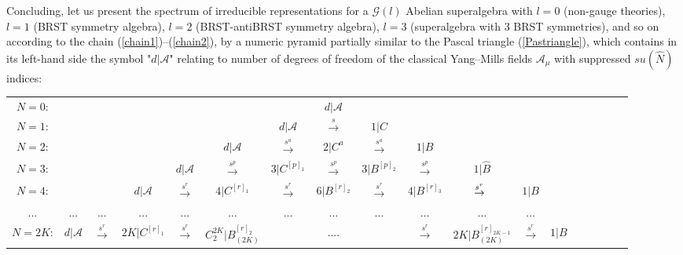 \documentclass[10pt]{article}
\begin{document}
Concluding, let us present  the  spectrum of irreducible representations for a $\mathcal{G}(l)$ Abelian superalgebra
with $l=0$ (non-gauge theories), $l=1$ (BRST symmetry algebra),
$l=2$ (BRST-antiBRST symmetry algebra), $l=3$ (superalgebra with $3$ BRST symmetries),
and so on according to the chain (\ref{chain1})--(\ref{chain2}),  by a numeric pyramid partially similar to the Pascal triangle
(\ref{Pastriangle}), which contains in its left-hand side the symbol "$d|\mathcal{A}$" relating to number of degrees of freedom  of the classical
Yang--Mills fields $\mathcal{A}_\mu$ with suppressed $su(\hat{N})$ indices:
\begin{table}
\begin{center}
{\footnotesize\begin{tabular}{ccccccccc ccccccccc}
     $N=0$:    &&&& && & $d|\mathcal{A}$ & & &&&&&\\
$N=1$: &&& & &&$d|\mathcal{A}$&\hspace{-0.5em}$\stackrel{s}{\to}$ & $1|C$&& &&&&&\\
$N=2$: & & && &\hspace{-0.5em}$d|\mathcal{A}$&$\stackrel{s{}^a}{\to}$& \hspace{-0.5em}$2|C^{a}$ &$\stackrel{s{}^a}{\to}$&$1|B$&&&\\
$N=3$: & && &$d|\mathcal{A}$&\hspace{-0.5em}$\stackrel{s{}^p}{\to}$ &\hspace{-0.5em}$3|C^{[p]_1}$& $\stackrel{s{}^p}{\to}$ &$3|B^{[p]_2}$&$\stackrel{s{}^p}{\to}$&\hspace{-0.5em}$1|\widehat{B}$&& \\
$N=4$:    &&&$d|\mathcal{A}$& $\stackrel{s{}^r}{\to}$ &$4|C^{[r]_1}$&\hspace{-0.5em}$\stackrel{s{}^r}{\to}$&$6|B^{[r]_2}$&$\stackrel{s{}^r}{\to}$&\hspace{-0.5em}$4|B^{[r]_3}$&$\hspace{-0.5em}\stackrel{s{}^r}{\to}$&\hspace{-0.8em}$1|B$ &\\
...&... & ...&... & ... &...
&...&...&...&...&...&...&&\\
$N=2K$:&\hspace{-0.5em}$d|\mathcal{A}$& \hspace{-0.5em}$\stackrel{s{}^r}{\to}$ &\hspace{-0.5em} $2K|C^{[r]_1}$&\hspace{-0.5em}$\stackrel{s{}^r}{\to}$& \hspace{-0.5em} $C^{2K}_2|B_{(2K)}^{[r]_2}$ &&....&&\hspace{-0.7em}$\stackrel{s{}^r}{\to}$ &\hspace{-0.7em}${2K}|B^{[r]_{2K-1}}_{(2K)} $&\hspace{-0.5em}$\stackrel{s{}^r}{\to}$&\hspace{-0.5em}$1|B$

\end{tabular}}
\end{center}
\end{table}
\end{document}
